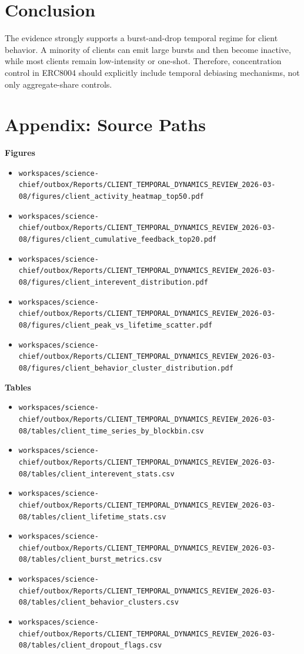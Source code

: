 \documentclass[11pt,a4paper]{article}
\begin{document}
\section*{Conclusion}
The evidence strongly supports a burst-and-drop temporal regime for client behavior. A minority of clients can emit large bursts and then become inactive, while most clients remain low-intensity or one-shot. Therefore, concentration control in ERC8004 should explicitly include temporal debiasing mechanisms, not only aggregate-share controls.

\section*{Appendix: Source Paths}
\textbf{Figures}\\
\begin{itemize}
\item \texttt{workspaces/science-chief/outbox/Reports/CLIENT\_TEMPORAL\_DYNAMICS\_REVIEW\_2026-03-08/figures/client\_activity\_heatmap\_top50.pdf}
\item \texttt{workspaces/science-chief/outbox/Reports/CLIENT\_TEMPORAL\_DYNAMICS\_REVIEW\_2026-03-08/figures/client\_cumulative\_feedback\_top20.pdf}
\item \texttt{workspaces/science-chief/outbox/Reports/CLIENT\_TEMPORAL\_DYNAMICS\_REVIEW\_2026-03-08/figures/client\_interevent\_distribution.pdf}
\item \texttt{workspaces/science-chief/outbox/Reports/CLIENT\_TEMPORAL\_DYNAMICS\_REVIEW\_2026-03-08/figures/client\_peak\_vs\_lifetime\_scatter.pdf}
\item \texttt{workspaces/science-chief/outbox/Reports/CLIENT\_TEMPORAL\_DYNAMICS\_REVIEW\_2026-03-08/figures/client\_behavior\_cluster\_distribution.pdf}
\end{itemize}

\textbf{Tables}\\
\begin{itemize}
\item \texttt{workspaces/science-chief/outbox/Reports/CLIENT\_TEMPORAL\_DYNAMICS\_REVIEW\_2026-03-08/tables/client\_time\_series\_by\_blockbin.csv}
\item \texttt{workspaces/science-chief/outbox/Reports/CLIENT\_TEMPORAL\_DYNAMICS\_REVIEW\_2026-03-08/tables/client\_interevent\_stats.csv}
\item \texttt{workspaces/science-chief/outbox/Reports/CLIENT\_TEMPORAL\_DYNAMICS\_REVIEW\_2026-03-08/tables/client\_lifetime\_stats.csv}
\item \texttt{workspaces/science-chief/outbox/Reports/CLIENT\_TEMPORAL\_DYNAMICS\_REVIEW\_2026-03-08/tables/client\_burst\_metrics.csv}
\item \texttt{workspaces/science-chief/outbox/Reports/CLIENT\_TEMPORAL\_DYNAMICS\_REVIEW\_2026-03-08/tables/client\_behavior\_clusters.csv}
\item \texttt{workspaces/science-chief/outbox/Reports/CLIENT\_TEMPORAL\_DYNAMICS\_REVIEW\_2026-03-08/tables/client\_dropout\_flags.csv}
\end{itemize}
\end{document}
